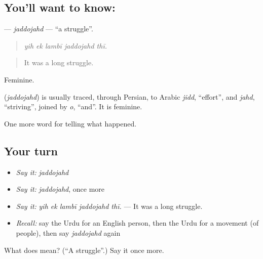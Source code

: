 \subsection*{You'll want to know: }
\textbf{} — \emph{jaddojahd} — \textquotedblleft{}a struggle\textquotedblright{}.

\begin{quote}
    
\end{quote}

\begin{quote}
\emph{yih ek lambī jaddojahd thī.}
\end{quote}

\begin{quote}
It was a long struggle.
\end{quote}

Feminine.

\begin{cousinweb}
\textbf{} (\emph{jaddojahd}) is usually traced, through Persian, to Arabic \emph{jidd}, \textquotedblleft{}effort\textquotedblright{}, and \emph{jahd}, \textquotedblleft{}striving\textquotedblright{}, joined by \emph{o}, \textquotedblleft{}and\textquotedblright{}. It is feminine.
\end{cousinweb}

\begin{grammarlens}[title={What you've built}]
One more word for telling what happened.
\end{grammarlens}

\subsection*{Your turn}
\begin{itemize}
\raggedright
  \item \emph{Say it:} \emph{jaddojahd}
  \item \emph{Say it:} \emph{jaddojahd}, once more
  \item \emph{Say it:} \emph{yih ek lambī jaddojahd thī.} — It was a long struggle.
  \item \emph{Recall:} say the Urdu for an English person, then the Urdu for a movement (of people), then say \emph{jaddojahd} again
\end{itemize}

\begin{tcolorbox}[breakable,colback=teal!4,colframe=teal!35!black,title={Before you move on}]
What does  mean? (\textquotedblleft{}A struggle\textquotedblright{}.) Say it once more.
\end{tcolorbox}
